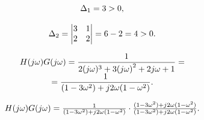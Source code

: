 \documentclass{article}
\begin{document}
\[
$$
\Delta_{1}=3 > 0,
$$
\]

\[
$$
\Delta_{2}=\left| \begin{matrix} {3} & {1} \\ {2} & {2} \\ \end{matrix} \right|=6-2=4 > 0.
$$
\]

\[
$$
\begin{array} {c} {{H ( j \omega) G ( j \omega)={\displaystyle\frac{1} {2 ( j \omega)^{3}+3 {( j \omega)}^{2}+2 j \omega+1}}=}} \\ {{={\displaystyle\frac{1} {( 1-3 \omega^{2} )+j 2 \omega( 1-\omega^{2} )}}.}} \end{array}
$$
\]

\[
$$
H ( j \omega) G ( j \omega)=\frac{1} {( 1-3 \omega^{2} )+j 2 \omega( 1-\omega^{2} )} \cdot\frac{( 1-3 \omega^{2} )+j 2 \omega( 1-\omega^{2} )} {( 1-3 \omega^{2} )+j 2 \omega( 1-\omega^{2} )}.
$$
\]
\end{document}
